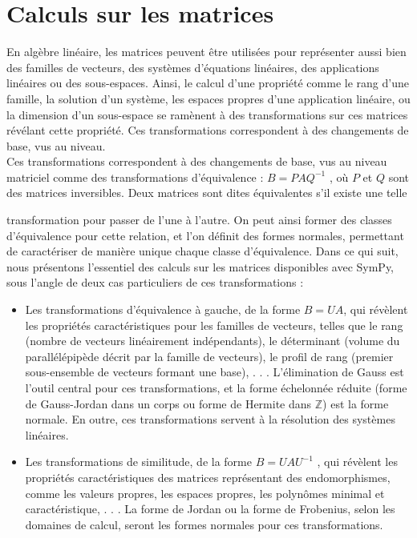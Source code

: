 \section{ Calculs sur les matrices}
En algèbre linéaire, les matrices peuvent être utilisées pour représenter aussi bien des familles de vecteurs, 
des systèmes d’équations linéaires, des applications linéaires ou des sous-espaces. Ainsi, le calcul d’une 
propriété comme le rang d’une famille, la solution d’un système, les espaces propres d’une application linéaire, 
ou la dimension d’un sous-espace se ramènent à des transformations sur ces matrices révélant cette propriété. 
Ces transformations correspondent à des changements de base, vus au niveau.
\\
Ces transformations correspondent à des changements de base, vus au niveau
matriciel comme des transformations d’équivalence : $B = PAQ^{-1}$ , où $P$ et $Q$ sont
des matrices inversibles. Deux matrices sont dites équivalentes s’il existe une telle

transformation pour passer de l’une à l’autre. On peut ainsi former des classes
d’équivalence pour cette relation, et l’on définit des formes normales, permettant
de caractériser de manière unique chaque classe d’équivalence. Dans ce qui suit,
nous présentons l’essentiel des calculs sur les matrices disponibles avec SymPy, sous
l’angle de deux cas particuliers de ces transformations :

\begin{itemize}
 	 \item Les transformations d’équivalence à gauche, de la forme $B = UA$, qui
révèlent les propriétés caractéristiques pour les familles de vecteurs, telles
que le rang (nombre de vecteurs linéairement indépendants), le déterminant
(volume du parallélépipède décrit par la famille de vecteurs), le profil de rang
(premier sous-ensemble de vecteurs formant une base), . . . L’élimination de
Gauss est l’outil central pour ces transformations, et la forme échelonnée
réduite (forme de Gauss-Jordan dans un corps ou forme de Hermite dans $\mathbb{Z}$)
est la forme normale. En outre, ces transformations servent à la résolution
des systèmes linéaires.
	 \item  Les transformations de similitude, de la forme $B = UAU^{-1}$ , qui révèlent les
propriétés caractéristiques des matrices représentant des endomorphismes,
comme les valeurs propres, les espaces propres, les polynômes minimal et
caractéristique, . . . La forme de Jordan ou la forme de Frobenius, selon les
domaines de calcul, seront les formes normales pour ces transformations.

\end{itemize}

